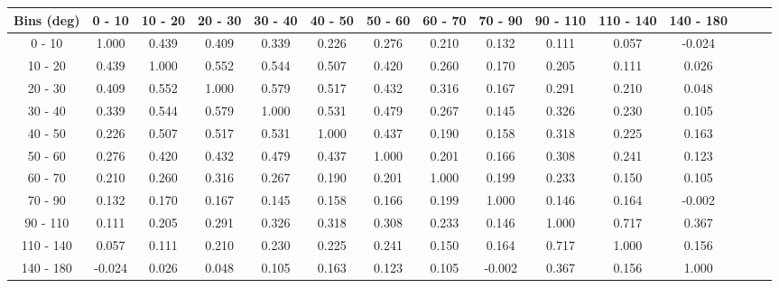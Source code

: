 \documentclass[aps, prd, reprint,showpacs,  preprintnumbers,amsmath,amssymb,superscriptaddress, nofootinbib]{revtex4-1}
\makeatletter
\renewenvironment{table}
  {\def\@captype{table}}
  {}
\makeatother
\begin{document}
\begin{table}
\centering
\begin{tabular}{ccccccccccccccc}
\hline
    Bins (deg) &       0 - 10 &      10 - 20 &      20 - 30 &      30 - 40 &      40 - 50 &      50 - 60 &    60 - 70 &   70 - 90 &  90 - 110 & 110 - 140 &  140 - 180 \\ 
\hline
    0 -    10  & 1.000  & 0.439  & 0.409  & 0.339  & 0.226  & 0.276  & 0.210  & 0.132  & 0.111  & 0.057  &-0.024 \\
   10 -    20  & 0.439  & 1.000  & 0.552  & 0.544  & 0.507  & 0.420  & 0.260  & 0.170  & 0.205  & 0.111  & 0.026 \\
   20 -    30  & 0.409  & 0.552  & 1.000  & 0.579  & 0.517  & 0.432  & 0.316  & 0.167  & 0.291  & 0.210  & 0.048 \\
   30 -    40  & 0.339  & 0.544  & 0.579  & 1.000  & 0.531  & 0.479  & 0.267  & 0.145  & 0.326  & 0.230  & 0.105 \\
   40 -    50  & 0.226  & 0.507  & 0.517  & 0.531  & 1.000  & 0.437  & 0.190  & 0.158  & 0.318  & 0.225  & 0.163 \\
   50 -    60  & 0.276  & 0.420  & 0.432  & 0.479  & 0.437  & 1.000  & 0.201  & 0.166  & 0.308  & 0.241  & 0.123 \\
   60 -    70  & 0.210  & 0.260  & 0.316  & 0.267  & 0.190  & 0.201  & 1.000  & 0.199  & 0.233  & 0.150  & 0.105 \\
   70 -    90  & 0.132  & 0.170  & 0.167  & 0.145  & 0.158  & 0.166  & 0.199  & 1.000  & 0.146  & 0.164  &-0.002 \\
   90 -   110  & 0.111  & 0.205  & 0.291  & 0.326  & 0.318  & 0.308  & 0.233  & 0.146  & 1.000  & 0.717  & 0.367 \\
  110 -   140  & 0.057  & 0.111  & 0.210  & 0.230  & 0.225  & 0.241  & 0.150  & 0.164  & 0.717  & 1.000  & 0.156 \\
  140 -   180  &-0.024  & 0.026  & 0.048  & 0.105  & 0.163  & 0.123  & 0.105  &-0.002  & 0.367  & 0.156  & 1.000 \\
\hline
\hline
\end{tabular}
\caption{Correlation matrix for bins of $d\sigma/d\theta_\pi$.}
\label{tb:piz_theta_cov}
\end{table}

\vspace{0.5cm}
\end{document}
